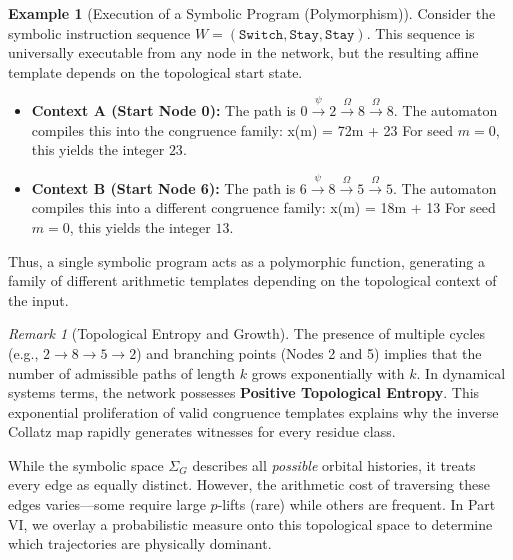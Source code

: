 \documentclass[11pt,letterpaper]{amsart}
\def\[{ }%
\def\]{ }%
\theoremstyle{definition}
\newtheorem{example}{Example}
\theoremstyle{plain}
\theoremstyle{plain}
\theoremstyle{remark}
\newtheorem*{remark}{Remark}
\begin{document}
\begin{example}[Execution of a Symbolic Program (Polymorphism)]
Consider the symbolic instruction sequence $W = (\texttt{Switch}, \texttt{Stay}, \texttt{Stay})$. This sequence is universally executable from any node in the network, but the resulting affine template depends on the topological start state.

\begin{itemize}
    \item \textbf{Context A (Start Node 0):}
    The path is $0 \xrightarrow{\psi} 2 \xrightarrow{\Omega} 8 \xrightarrow{\Omega} 8$.
    The automaton compiles this into the congruence family:
    \[ x(m) = 72m + 23 \]
    For seed $m=0$, this yields the integer $23$.

    \item \textbf{Context B (Start Node 6):}
    The path is $6 \xrightarrow{\psi} 8 \xrightarrow{\Omega} 5 \xrightarrow{\Omega} 5$.
    The automaton compiles this into a different congruence family:
    \[ x(m) = 18m + 13 \]
    For seed $m=0$, this yields the integer $13$.
\end{itemize}
Thus, a single symbolic program acts as a polymorphic function, generating a family of different arithmetic templates depending on the topological context of the input.
\end{example}

\begin{remark}[Topological Entropy and Growth]
The presence of multiple cycles (e.g., $2 \to 8 \to 5 \to 2$) and branching points (Nodes 2 and 5) implies that the number of admissible paths of length $k$ grows exponentially with $k$. In dynamical systems terms, the network possesses \textbf{Positive Topological Entropy}. This exponential proliferation of valid congruence templates explains why the inverse Collatz map rapidly generates witnesses for every residue class.
\end{remark}

While the symbolic space $\Sigma_G$ describes all \emph{possible} orbital histories, it treats every edge as equally distinct. However, the arithmetic cost of traversing these edges varies—some require large $p$-lifts (rare) while others are frequent. In Part VI, we overlay a probabilistic measure onto this topological space to determine which trajectories are physically dominant.


\end{document}
